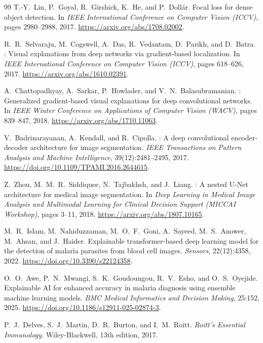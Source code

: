 \documentclass[10pt,twocolumn]{article}
\begin{document}
\begin{thebibliography}{99}
T.-Y.~Lin, P.~Goyal, R.~Girshick, K.~He, and P.~Doll{\'{a}}r.
\newblock Focal loss for dense object detection.
\newblock In \textit{IEEE International Conference on Computer Vision (ICCV)},
  pages 2980--2988, 2017.
\newblock \url{https://arxiv.org/abs/1708.02002}.

R.~R.~Selvaraju, M.~Cogswell, A.~Das, R.~Vedantam, D.~Parikh, and D.~Batra.
: Visual explanations from deep networks via
  gradient-based localization.
\newblock In \textit{IEEE International Conference on Computer Vision (ICCV)},
  pages 618--626, 2017.
\newblock \url{https://arxiv.org/abs/1610.02391}.

A.~Chattopadhyay, A.~Sarkar, P.~Howlader, and V.~N.~Balasubramanian.
: Generalized gradient-based visual explanations for
  deep convolutional networks.
\newblock In \textit{IEEE Winter Conference on Applications of Computer Vision
  (WACV)}, pages 839--847, 2018.
\newblock \url{https://arxiv.org/abs/1710.11063}.

V.~Badrinarayanan, A.~Kendall, and R.~Cipolla.
: A deep convolutional encoder-decoder architecture for
  image segmentation.
\newblock \textit{IEEE Transactions on Pattern Analysis and Machine
  Intelligence}, 39(12):2481--2495, 2017.
\newblock \url{https://doi.org/10.1109/TPAMI.2016.2644615}.

Z.~Zhou, M.~M.~R.~Siddiquee, N.~Tajbakhsh, and J.~Liang.
: A nested {U-Net} architecture for medical image
  segmentation.
\newblock In \textit{Deep Learning in Medical Image Analysis and Multimodal
  Learning for Clinical Decision Support (MICCAI Workshop)}, pages 3--11, 2018.
\newblock \url{https://arxiv.org/abs/1807.10165}.

M.~R.~Islam, M.~Nahiduzzaman, M.~O.~F.~Goni, A.~Sayeed, M.~S.~Anower,
  M.~Ahsan, and J.~Haider.
\newblock Explainable transformer-based deep learning model for the detection
  of malaria parasites from blood cell images.
\newblock \textit{Sensors}, 22(12):4358, 2022.
\newblock \url{https://doi.org/10.3390/s22124358}.

O.~O.~Awe, P.~N.~Mwangi, S.~K.~Goudoungou, R.~V.~Esho, and O.~S.~Oyejide.
\newblock Explainable {AI} for enhanced accuracy in malaria diagnosis using
  ensemble machine learning models.
\newblock \textit{BMC Medical Informatics and Decision Making}, 25:152, 2025.
\newblock \url{https://doi.org/10.1186/s12911-025-02874-3}.

P.~J.~Delves, S.~J.~Martin, D.~R.~Burton, and I.~M.~Roitt.
\newblock \textit{Roitt's Essential Immunology}.
\newblock Wiley-Blackwell, 13th edition, 2017.

\end{thebibliography}
\end{document}
